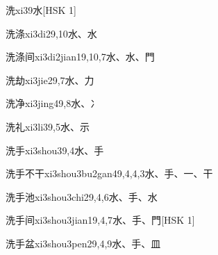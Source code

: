 \begin{entry}{洗}{xi3}{9}{⽔}[HSK 1]
\end{entry}

\begin{entry}{洗涤}{xi3di2}{9,10}{⽔、⽔}
\end{entry}

\begin{entry}{洗涤间}{xi3di2jian1}{9,10,7}{⽔、⽔、⾨}
\end{entry}

\begin{entry}{洗劫}{xi3jie2}{9,7}{⽔、⼒}
\end{entry}

\begin{entry}{洗净}{xi3jing4}{9,8}{⽔、⼎}
\end{entry}

\begin{entry}{洗礼}{xi3li3}{9,5}{⽔、⽰}
\end{entry}

\begin{entry}{洗手}{xi3shou3}{9,4}{⽔、⼿}
\end{entry}

\begin{entry}{洗手不干}{xi3shou3bu2gan4}{9,4,4,3}{⽔、⼿、⼀、⼲}
\end{entry}

\begin{entry}{洗手池}{xi3shou3chi2}{9,4,6}{⽔、⼿、⽔}
\end{entry}

\begin{entry}{洗手间}{xi3shou3jian1}{9,4,7}{⽔、⼿、⾨}[HSK 1]
\end{entry}

\begin{entry}{洗手盆}{xi3shou3pen2}{9,4,9}{⽔、⼿、⽫}
\end{entry}

